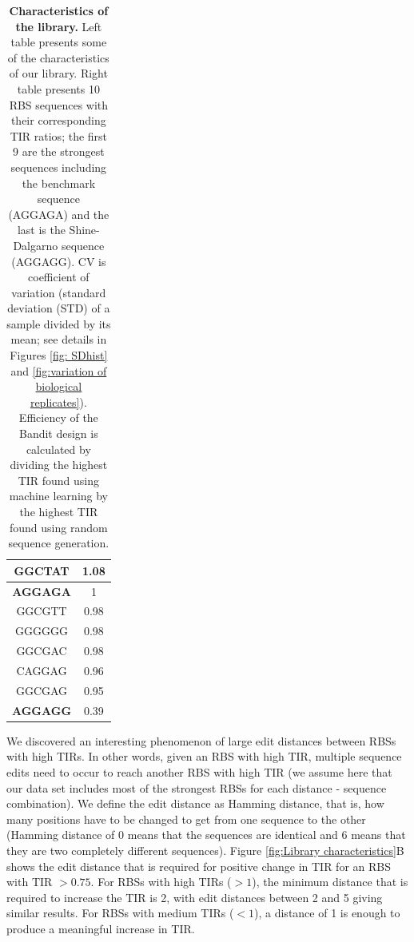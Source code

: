 \documentclass{scrartcl}[2013/05/29]%
\begin{document}
\begin{table}[!h]
\begin{minipage}[c]{0.38\textwidth}
\begin{tabular}{|c|c|}
GGCTAT                & 1.08              \\ \hline
\textbf{AGGAGA}                & 1                  \\ \hline
GGCGTT                & 0.98            \\ \hline
GGGGGG                & 0.98             \\ \hline
GGCGAC                & 0.98             \\ \hline
CAGGAG                & 0.96             \\ \hline
GGCGAG                & 0.95             \\ \hline
\textbf{AGGAGG}       & 0.39            \\ \hline
\end{tabular}
\end{minipage}
\caption{\textbf{Characteristics of the library.}
Left table presents some of the characteristics of our library.
Right table presents 10 RBS sequences with their corresponding TIR ratios; the first 9 are the strongest sequences including the benchmark sequence (AGGAGA) and the last is the Shine-Dalgarno sequence (AGGAGG).
CV is coefficient of variation (standard deviation (STD) of a sample divided by its mean; see details in Figures \ref{fig: SDhist} and \ref{fig:variation of biological replicates}).
Efficiency of the Bandit design is calculated by dividing the highest TIR found using machine learning by the highest TIR found using random sequence generation.}
\end{table}

We discovered an interesting phenomenon of large edit distances between RBSs with high TIRs.
In other words, given an RBS with high TIR, multiple sequence edits need to occur to reach another RBS with high TIR (we assume here that our data set includes most of the strongest RBSs for each distance - sequence combination).
We define the edit distance as Hamming distance, that is, how many positions have to be changed to get from one sequence to the other (Hamming distance of 0 means that the sequences are identical and 6 means that they are two completely different sequences).
Figure \ref{fig:Library characteristics}B shows the edit distance that is required for positive change in TIR for an RBS with TIR $>0.75$.
For RBSs with high TIRs ($>1$), the minimum distance that is required to increase the TIR is 2, with edit distances between 2 and 5 giving similar results.
For RBSs with medium TIRs ($<1$), a distance of 1 is enough to produce a meaningful increase in TIR.
\\
\end{document}

